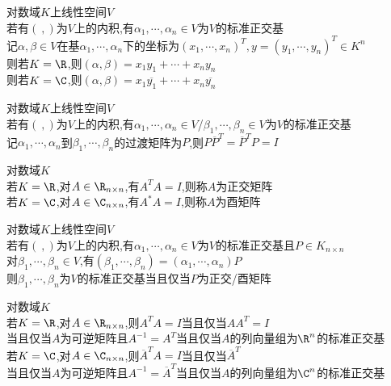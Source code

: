 \begin{dingli}
对数域$K$上线性空间$V$\\
若有$(\ ,)$为$V$上的内积,有$\alpha_1,\cdots,\alpha_n\in V$为$V$的标准正交基\\
记$\alpha,\beta\in V$在基$\alpha_1,\cdots,\alpha_n$下的坐标为$(x_1,\cdots,x_n)^{T},y=(y_1,\cdots,y_n)^{T}\in K^n$\\
则若$K=\R$,则$(\alpha,\beta)=x_1y_1+\cdots+x_ny_n$\\
则若$K=\C$,则$(\alpha,\beta)=x_1\overline{y_1}+\cdots+x_n\overline{y_n}$
\end{dingli}

\begin{dingli}
对数域$K$上线性空间$V$\\
若有$(\ ,)$为$V$上的内积,有$\alpha_1,\cdots,\alpha_n\in V$/$\beta_1,\cdots,\beta_n\in V$为$V$的标准正交基\\
记$\alpha_1,\cdots,\alpha_n$到$\beta_1,\cdots,\beta_n$的过渡矩阵为$P$,则$P\overline{P}^{T}=\overline{P}^{T}P=I$
\end{dingli}

\begin{dingli}
对数域$K$\\
若$K=\R$,对$A\in \R_{n\times n}$,有$A^{T}A=I$,则称$A$为正交矩阵\\
若$K=\C$,对$A\in \C_{n\times n}$,有$A^*A=I$,则称$A$为酉矩阵
\end{dingli}

\begin{dingli}
对数域$K$上线性空间$V$\\
若有$(\ ,)$为$V$上的内积,有$\alpha_1,\cdots,\alpha_n\in V$为$V$的标准正交基且$P\in K_{n\times n}$\\
对$\beta_1,\cdots,\beta_n\in V$,有$(\beta_1,\cdots,\beta_n)=(\alpha_1,\cdots,\alpha_n)P$\\
则$\beta_1,\cdots,\beta_n$为$V$的标准正交基当且仅当$P$为正交/酉矩阵
\end{dingli}

\begin{dingli}
对数域$K$\\
若$K=\R$,对$A\in \R_{n\times n}$,则$A^{T}A=I$当且仅当$AA^{T}=I$\\
当且仅当$A$为可逆矩阵且$A^{-1}=A^{T}$当且仅当$A$的列向量组为$\R^n$的标准正交基\\
若$K=\C$,对$A\in \C_{n\times n}$,则$\overline{A}^{T}A=I$当且仅当$\overline{A}^{T}$\\
当且仅当$A$为可逆矩阵且$A^{-1}=\overline{A}^{T}$当且仅当$A$的列向量组为$\C^n$的标准正交基
\end{dingli}

